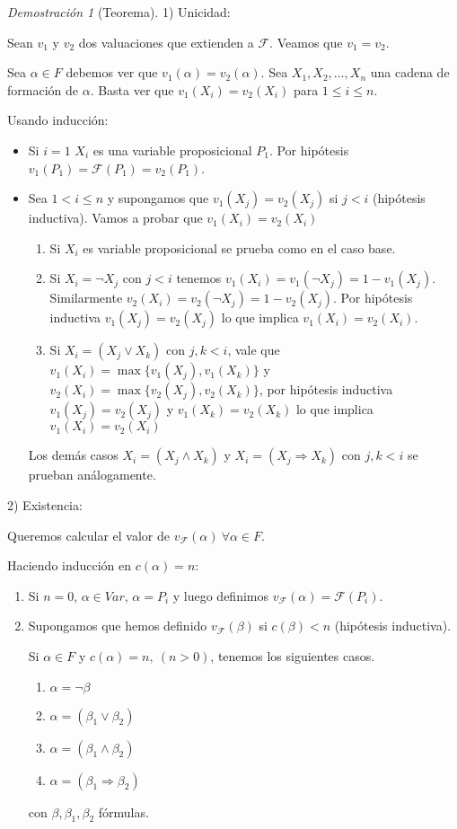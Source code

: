 \documentclass[a4paper,11pt]{article}
\theoremstyle{definition}
\theoremstyle{remark}
\newtheorem*{demo}{Demostración}
\def\FF{\mathcal{F}}
\begin{document}
\begin{demo}[Teorema]
1) Unicidad: 

Sean $v_1$ y $v_2$ dos valuaciones que extienden a $\mathcal F$. Veamos que $v_1 = v_2$.

Sea $\alpha \in F$ debemos ver que $v_1(\alpha) = v_2(\alpha)$. Sea $X_1, X_2, \dots, X_n$ una 
cadena de formación de $\alpha$. Basta ver que $v_1(X_i) = v_2(X_i)$ para $1 \le i \le n$.

Usando inducción:
\begin{itemize}
\item Si $i = 1$ $X_i$ es una variable proposicional $P_1$. Por hipótesis
$v_1(P_1) = \mathcal F(P_1) = v_2(P_1)$.
\item Sea $1 < i \le n$ y supongamos que $v_1(X_j) = v_2(X_j)$ si $j < i$ (hipótesis inductiva).
Vamos a probar que $v_1(X_i) = v_2(X_i)$

\begin{enumerate}[label=\emph{\roman*})]
\item Si $X_i$ es variable proposicional se prueba como en el caso base.
\item Si $X_i = \neg X_j$ con $j < i$ tenemos $v_1(X_i) = v_1(\neg X_j) = 1 - v_1(X_j)$.
Similarmente $v_2(X_i) = v_2(\neg X_j) = 1 - v_2(X_j)$. Por hipótesis inductiva
$v_1(X_j) = v_2(X_j)$ lo que implica $v_1(X_i) = v_2(X_i)$.
\item Si $X_i = (X_j \vee X_k)$ con $j, k < i$, vale que $v_1(X_i) = \max\{v_1(X_j), v_1(X_k)\}$
y $v_2(X_i) = \max\{v_2(X_j), v_2(X_k)\}$, por hipótesis inductiva $v_1(X_j) = v_2(X_j)$ y
$v_1(X_k) = v_2(X_k)$ lo que implica $v_1(X_i) = v_2(X_i)$
\end{enumerate}
Los demás casos $X_i = (X_j \wedge X_k)$ y $X_i = (X_j \Rightarrow X_k)$ con $j, k < i$
se prueban análogamente.
\end{itemize}

2) Existencia:

Queremos calcular el valor de $v_{\mathcal F}(\alpha)\ \forall \alpha \in F$.

Haciendo inducción en $c(\alpha) = n$:

\begin{enumerate}
\item Si $n=0$, $\alpha \in Var$, $\alpha = P_i$ y luego definimos 
$v_{\mathcal F}(\alpha) = \mathcal F(P_i)$.
\item Supongamos que hemos definido $v_{\FF}(\beta)$ si $c(\beta) < n$ (hipótesis inductiva).

Si $\alpha \in F$ y $c(\alpha) = n,\ (n > 0)$, tenemos los siguientes casos.
\begin{enumerate}[label=\emph{\alph*})]
\item $\alpha = \neg\beta$
\item $\alpha = (\beta_1 \vee \beta_2)$
\item $\alpha = (\beta_1 \wedge \beta_2)$
\item $\alpha = (\beta_1 \Rightarrow \beta_2)$
\end{enumerate}
con $\beta, \beta_1, \beta_2$ fórmulas.


\end{enumerate}
\end{demo}
\end{document}
